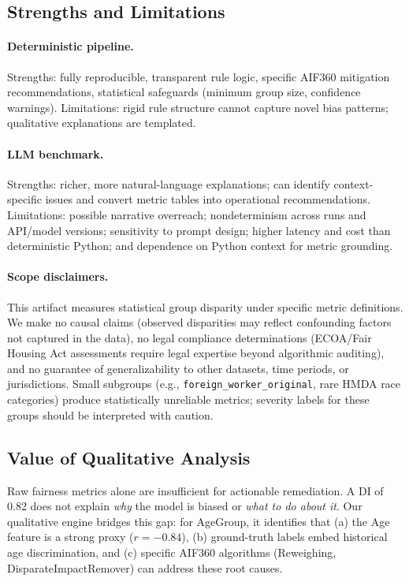 \documentclass[11pt,a4paper]{article}
\begin{document}
\subsection{Strengths and Limitations}

\paragraph{Deterministic pipeline.}
Strengths: fully reproducible, transparent rule logic, specific AIF360
mitigation recommendations, statistical safeguards (minimum group size,
confidence warnings). Limitations: rigid rule structure cannot capture
novel bias patterns; qualitative explanations are templated.

\paragraph{LLM benchmark.}
Strengths: richer, more natural-language explanations; can identify
context-specific issues and convert metric tables into operational
recommendations. Limitations: possible narrative overreach; nondeterminism
across runs and API/model versions; sensitivity to prompt design; higher
latency and cost than deterministic Python; and dependence on Python context
for metric grounding.

\paragraph{Scope disclaimers.}
This artifact measures statistical group disparity under specific metric
definitions. We make no causal claims (observed disparities may reflect
confounding factors not captured in the data), no legal compliance
determinations (ECOA/Fair Housing Act assessments require legal expertise
beyond algorithmic auditing), and no guarantee of generalizability to other
datasets, time periods, or jurisdictions. Small subgroups (e.g.,
\texttt{foreign\_worker\_original}, rare HMDA race categories) produce
statistically unreliable metrics; severity labels for these groups should be
interpreted with caution.

\subsection{Value of Qualitative Analysis}

Raw fairness metrics alone are insufficient for actionable remediation.
A DI of 0.82 does not explain \emph{why} the model is biased or
\emph{what to do about it}. Our qualitative engine bridges this gap:
for AgeGroup, it identifies that (a) the Age feature is a strong proxy
($r{=}{-}0.84$), (b) ground-truth labels embed historical age
discrimination, and (c) specific AIF360 algorithms
(Reweighing, DisparateImpactRemover) can address these root causes.
\end{document}
